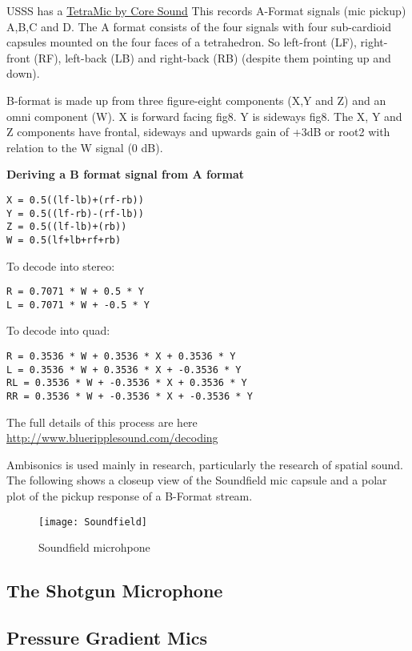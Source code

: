 USSS has a \href{http://www.core-sound.com/TetraMic/1.php}{TetraMic by Core Sound}
This records A-Format signals (mic pickup) A,B,C and D. The A format consists of the four signals with four sub-cardioid capsules mounted on the four faces of a tetrahedron. So left-front (LF), right-front (RF), left-back (LB) and right-back (RB) (despite them pointing up and down). 

B-format is made up from three figure-eight components (X,Y and Z) and an omni component (W). X is forward facing fig8. Y is sideways fig8. The X, Y and Z components have frontal, sideways and upwards gain of +3dB or root2 with relation to the W signal (0 dB). 

\textbf{Deriving a B format signal from A format}
\begin{verbatim} 
X = 0.5((lf-lb)+(rf-rb))
Y = 0.5((lf-rb)-(rf-lb))
Z = 0.5((lf-lb)+(rb))
W = 0.5(lf+lb+rf+rb)
\end{verbatim} 

To decode into stereo:
\begin{verbatim} 
R = 0.7071 * W + 0.5 * Y
L = 0.7071 * W + -0.5 * Y
\end{verbatim}

To decode into quad:
\begin{verbatim}
R = 0.3536 * W + 0.3536 * X + 0.3536 * Y
L = 0.3536 * W + 0.3536 * X + -0.3536 * Y
RL = 0.3536 * W + -0.3536 * X + 0.3536 * Y
RR = 0.3536 * W + -0.3536 * X + -0.3536 * Y
\end{verbatim}

The full details of this process are here \url{http://www.blueripplesound.com/decoding}


Ambisonics is used mainly in research, particularly the research of spatial sound. The following shows a closeup view of the Soundfield mic capsule and a polar plot of the pickup response of a B-Format stream.


\begin{figure}[H]
\centering
\texttt{[image: Soundfield]}\caption{Soundfield microhpone}
\label{fig:soundfield}
\end{figure}

\subsection{The Shotgun Microphone}

\subsection{Pressure Gradient Mics}

